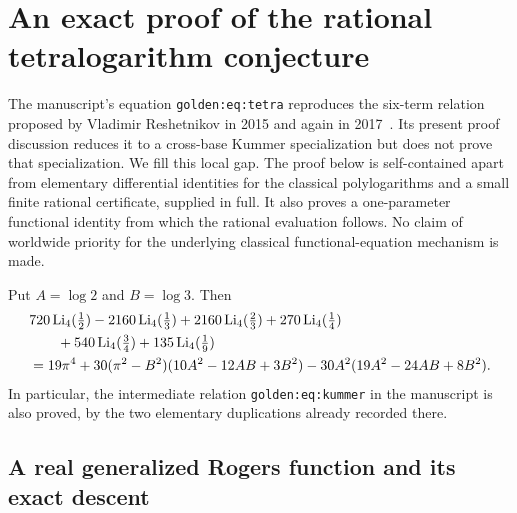 
\section{An exact proof of the rational tetralogarithm conjecture}
\label{rattetra:sec}

The manuscript's equation \texttt{golden:eq:tetra} reproduces the
six-term relation proposed by Vladimir Reshetnikov in 2015 and again
in 2017~\cite{Reshetnikov2015,Reshetnikov2017}. Its present proof discussion reduces it to a cross-base Kummer
specialization but does not prove that specialization. We fill this local
gap. The proof below is self-contained apart from elementary differential
identities for the classical polylogarithms and a small finite rational
certificate, supplied in full. It also proves a one-parameter functional
identity from which the rational evaluation follows. No claim of worldwide
priority for the underlying classical functional-equation mechanism is made.

\begin{theorem}
\label{rattetra:thm:main}
Put $A=\log2$ and $B=\log3$. Then
\begin{align}
&720\operatorname{Li}_4(\tfrac12)
 -2160\operatorname{Li}_4(\tfrac13)
 +2160\operatorname{Li}_4(\tfrac23)
 +270\operatorname{Li}_4(\tfrac14)\notag\\
&\qquad+540\operatorname{Li}_4(\tfrac34)
 +135\operatorname{Li}_4(\tfrac19)\notag\\
&=19\pi^4+30(\pi^2-B^2)(10A^2-12AB+3B^2)
       -30A^2(19A^2-24AB+8B^2).
\label{rattetra:eq:main}
\end{align}
In particular, the intermediate relation \texttt{golden:eq:kummer}
in the manuscript is also proved, by the two elementary duplications
already recorded there.
\end{theorem}

\subsection{A real generalized Rogers function and its exact descent}

